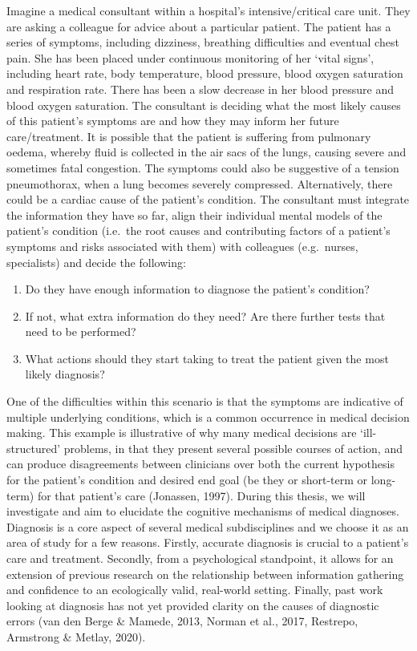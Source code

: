 \documentclass[a4paper, nobind]{templates/ociamthesis}
\providecommand{\tightlist}{%
  \setlength{\itemsep}{0pt}\setlength{\parskip}{0pt}}
\begin{document}
Imagine a medical consultant within a hospital's intensive/critical care unit. They are asking a colleague for advice about a particular patient. The patient has a series of symptoms, including dizziness, breathing difficulties and eventual chest pain. She has been placed under continuous monitoring of her `vital signs', including heart rate, body temperature, blood pressure, blood oxygen saturation and respiration rate. There has been a slow decrease in her blood pressure and blood oxygen saturation. The consultant is deciding what the most likely causes of this patient's symptoms are and how they may inform her future care/treatment. It is possible that the patient is suffering from pulmonary oedema, whereby fluid is collected in the air sacs of the lungs, causing severe and sometimes fatal congestion. The symptoms could also be suggestive of a tension pneumothorax, when a lung becomes severely compressed. Alternatively, there could be a cardiac cause of the patient's condition. The consultant must integrate the information they have so far, align their individual mental models of the patient's condition (i.e.~the root causes and contributing factors of a patient's symptoms and risks associated with them) with colleagues (e.g.~nurses, specialists) and decide the following:

\begin{enumerate}
\def\labelenumi{\arabic{enumi}.}
\tightlist
\item
  Do they have enough information to diagnose the patient's condition?
\item
  If not, what extra information do they need? Are there further tests that need to be performed?
\item
  What actions should they start taking to treat the patient given the most likely diagnosis?
\end{enumerate}

One of the difficulties within this scenario is that the symptoms are indicative of multiple underlying conditions, which is a common occurrence in medical decision making. This example is illustrative of why many medical decisions are `ill-structured' problems, in that they present several possible courses of action, and can produce disagreements between clinicians over both the current hypothesis for the patient's condition and desired end goal (be they or short-term or long-term) for that patient's care (Jonassen, 1997). During this thesis, we will investigate and aim to elucidate the cognitive mechanisms of medical diagnoses. Diagnosis is a core aspect of several medical subdisciplines and we choose it as an area of study for a few reasons. Firstly, accurate diagnosis is crucial to a patient's care and treatment. Secondly, from a psychological standpoint, it allows for an extension of previous research on the relationship between information gathering and confidence to an ecologically valid, real-world setting. Finally, past work looking at diagnosis has not yet provided clarity on the causes of diagnostic errors (van den Berge \& Mamede, 2013, Norman et al., 2017, Restrepo, Armstrong \& Metlay, 2020).
\end{document}
